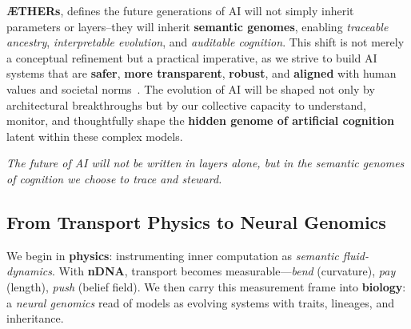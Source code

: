 \vspace{1mm}
\textbf{ÆTHERs}, defines the future generations of AI will not simply inherit parameters or layers--they will inherit \textbf{semantic genomes}, enabling \emph{traceable ancestry}, \emph{interpretable evolution}, and \emph{auditable cognition}. This shift is not merely a conceptual refinement but a practical imperative, as we strive to build AI systems that are \textbf{safer}, \textbf{more transparent}, \textbf{robust}, and \textbf{aligned} with human values and societal norms~\citep{bai2022training, perez2022discovering, zhou2023alignmentdrift}. The evolution of AI will be shaped not only by architectural breakthroughs but by our collective capacity to understand, monitor, and thoughtfully shape the \textbf{hidden genome of artificial cognition} latent within these complex models.

\vspace{2mm}
\begin{center}
\emph{The future of AI will not be written in layers alone, but in the semantic genomes of cognition we choose to trace and steward.}
\end{center}


\subsection*{From Transport Physics to Neural Genomics}
\label{subsec:transport-to-genomics}
\noindent We begin in \textbf{physics}: instrumenting inner computation as \emph{semantic fluid-dynamics}. With \textbf{nDNA}, transport becomes measurable---\emph{bend} (curvature), \emph{pay} (length), \emph{push} (belief field). We then carry this measurement frame into \textbf{biology}: a \emph{neural genomics} read of models as evolving systems with traits, lineages, and inheritance.


